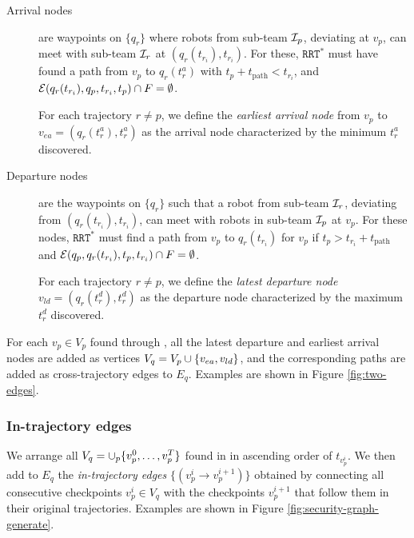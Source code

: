 \documentclass[10pt,twocolumn,twoside]{IEEEtran}
\newcommand{\rrtstar}{$\texttt{RRT}^\texttt{*}$}
\begin{document}
\begin{description}
\item[Arrival nodes] are waypoints on $\{q_r\}$ where robots from sub-team $\mathcal{I}_p$, deviating at $v_p$, can meet with sub-team $\mathcal{I}_r$ at $(q_r(t_{r_i}),t_{r_i})$. For these, \rrtstar{} must have found a path from $v_p$ to $q_{r}(t^{a}_r)$ with $t_{p}+t_{\textrm{path}}<t_{{r}_{i}}$, and $\mathcal{E}(q_{r}(t_{{r}_{i}}),q_{p},t_{{r}_{i}},t_{p}) \cap F = \emptyset$.

For each trajectory $r\neq p$, we define the \emph{earliest arrival node} from $v_p$ to $v_{ea} = (q_{r}(t^{a}_r),t^{a}_r)$ as the arrival node characterized by the minimum $t^{a}_r$ discovered. 

\item[Departure nodes] are the waypoints on $\{q_r\}$ such that a robot from sub-team $\mathcal{I}_r$, deviating from $(q_{r}(t_{{r}_{i}}),t_{{r}_{i}})$, can meet with robots in sub-team $\mathcal{I}_p$ at $v_{p}$. For these nodes, \rrtstar{} must find a path from $v_p$ to $q_{r}(t_{{r}_{i}})$ for $v_p$ if  $t_{p}>t_{{r}_{i}}+t_{\textrm{path}}$ and $\mathcal{E}(q_{p}, q_{r}(t_{{r}_{i}}),t_{p}, t_{{r}_{i}}) \cap F = \emptyset$. 

For each trajectory $r\neq p$, we define the \emph{latest departure node} $v_{ld}=(q_{r}(t^{d}_r),t^{d}_r)$ as the departure node characterized by the maximum $t^{d}_r$ discovered.
\end{description}

For each $v_{p} \in V_{p}$ found through , all the latest departure and earliest arrival nodes are added as vertices $V_q = V_{p} \cup \{v_{ea}, v_{ld}\}$, and the corresponding paths are added as cross-trajectory edges to $E_{q}$. Examples are shown in Figure \ref{fig:two-edges}.

\subsubsection{In-trajectory edges}\label{sec:Graph-intro}

We arrange all $V_q =\cup_p \{v^0_{p}, \dots ,v^T_{p}\}$ found in  in ascending order of $t_{v^i_{p}}$. We then add to $E_q$ the \emph{in-trajectory edges} $\{(v^i_{p}\rightarrow v^{i+1}_{p})\}$ obtained by connecting all consecutive checkpoints $v^i_{p}\in V_q$ with the checkpoints $v^{i+1}_{p}$ that follow them in their original trajectories. Examples are shown in Figure \ref{fig:security-graph-generate}. %
\end{document}
